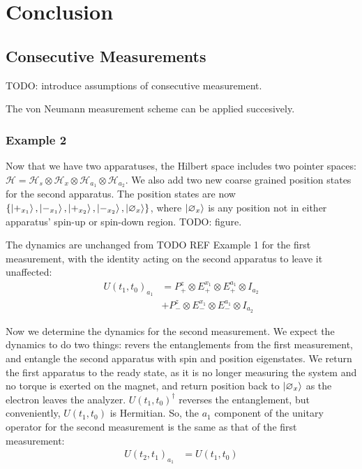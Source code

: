 \chapter{Conclusion}
{}



\section{Consecutive Measurements}
TODO: introduce assumptions of consecutive measurement.

The von Neumann measurement scheme can be applied succesively.

\subsection{Example 2}
Now that we have two apparatuses, the Hilbert space includes two pointer spaces: $\mathcal{H} = \mathcal{H}_s \otimes \mathcal{H}_x \otimes \mathcal{H}_{a_1} \otimes \mathcal{H}_{a_2}$. We also add two new coarse grained position states for the second apparatus. The position states are now $\{\ket{+_{x_1}}, \ket{-_{x_1}}, \ket{+_{x_2}}, \ket{-_{x_2}}, \ket{\varnothing_x}\}$, where $\ket{\varnothing_x}$ is any position not in either apparatus' spin-up or spin-down region. TODO: figure.

The dynamics are unchanged from TODO REF Example 1 for the first measurement, with the identity acting on the second apparatus to leave it unaffected:
\begin{align}
  U(t_1, t_0)_{a_1} &= P^z_+ \otimes E^{x_1}_+  \nonumber \otimes E^{a_1}_+ \otimes I_{a_2}\\ \nonumber
  &+ P^z_- \otimes E^{x_1}_-\otimes E^{a_1}_- \otimes I_{a_2}
\end{align}

Now we determine the dynamics for the second measurement. We expect the dynamics to do two things: revers the entanglements from the first measurement, and entangle the second apparatus with spin and position eigenstates. We return the first apparatus to the ready state, as it is no longer measuring the system and no torque is exerted on the magnet, and return position back to $\ket{\varnothing_x}$ as the electron leaves the analyzer. $U(t_1, t_0)^\dagger$ reverses the entanglement, but conveniently, $U(t_1, t_0)$ is Hermitian. So, the $a_1$ component of the unitary operator for the second measurement is the same as that of the first measurement:
\begin{align}
  U(t_2, t_1)_{a_1} &= U(t_1, t_0)
\end{align}

